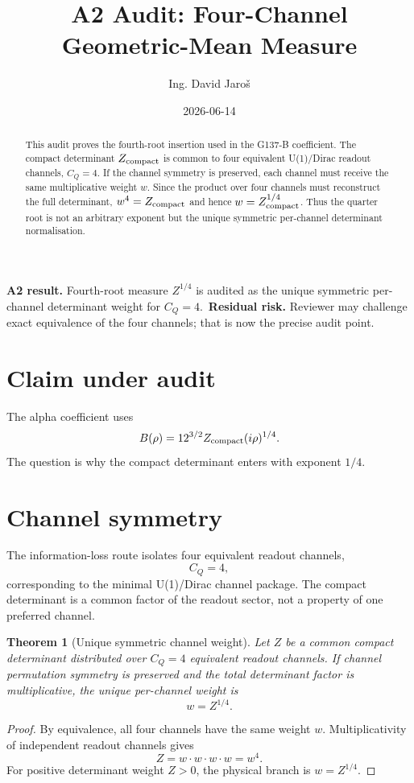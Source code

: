 \documentclass[12pt,a4paper]{article}
\title{A2 Audit: Four-Channel Geometric-Mean Measure}
\author{Ing. David Jaroš}
\date{2026-06-14}
\newtheorem{theorem}{Theorem}[section]
\begin{document}
\maketitle
\begin{abstract}
This audit proves the fourth-root insertion used in the G137-B coefficient.  The compact determinant $Z_{\rm compact}$ is common to four equivalent U(1)/Dirac readout channels, $C_Q=4$.  If the channel symmetry is preserved, each channel must receive the same multiplicative weight $w$.  Since the product over four channels must reconstruct the full determinant, $w^4=Z_{\rm compact}$ and hence $w=Z_{\rm compact}^{1/4}$.  Thus the quarter root is not an arbitrary exponent but the unique symmetric per-channel determinant normalisation.
\end{abstract}
\begin{statusbox}
\textbf{A2 result.} Fourth-root measure $Z^{1/4}$ is audited as the unique symmetric per-channel determinant weight for $C_Q=4$.\
\textbf{Residual risk.} Reviewer may challenge exact equivalence of the four channels; that is now the precise audit point.
\end{statusbox}
\section{Claim under audit}
The alpha coefficient uses
\[
  B(\rho)=12^{3/2}Z_{\rm compact}(i\rho)^{1/4}.
\]
The question is why the compact determinant enters with exponent $1/4$.
\section{Channel symmetry}
The information-loss route isolates four equivalent readout channels,
\[
  C_Q=4,
\]
corresponding to the minimal U(1)/Dirac channel package.  The compact determinant is a common factor of the readout sector, not a property of one preferred channel.
\begin{theorem}[Unique symmetric channel weight]
Let $Z$ be a common compact determinant distributed over $C_Q=4$ equivalent readout channels.  If channel permutation symmetry is preserved and the total determinant factor is multiplicative, the unique per-channel weight is
\[
  w=Z^{1/4}.
\]
\end{theorem}
\begin{proof}
By equivalence, all four channels have the same weight $w$.  Multiplicativity of independent readout channels gives
\[
  Z=w\cdot w\cdot w\cdot w=w^4.
\]
For positive determinant weight $Z>0$, the physical branch is $w=Z^{1/4}$.
\end{proof}
\end{document}
